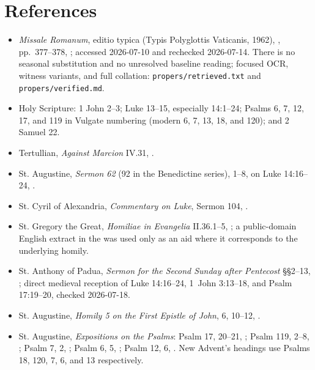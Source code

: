 \section*{References}
{\small
\begin{itemize}
\item \emph{Missale Romanum}, editio typica (Typis Polyglottis Vaticanis, 1962), , pp.~377--378, ; accessed 2026-07-10 and rechecked 2026-07-14. There is no seasonal substitution and no unresolved baseline reading; focused OCR, witness variants, and full collation: \nolinkurl{propers/retrieved.txt} and \nolinkurl{propers/verified.md}.
\item Holy Scripture: 1 John 2--3; Luke 13--15, especially 14:1--24; Psalms 6, 7, 12, 17, and 119 in Vulgate numbering (modern 6, 7, 13, 18, and 120); and 2 Samuel 22.
\item Tertullian, \emph{Against Marcion} IV.31, .
\item St. Augustine, \emph{Sermon 62} (92 in the Benedictine series), 1--8, on Luke 14:16--24, .
\item St. Cyril of Alexandria, \emph{Commentary on Luke}, Sermon 104, .
\item St. Gregory the Great, \emph{Homiliae in Evangelia} II.36.1--5, ; a public-domain English extract in the  was used only as an aid where it corresponds to the underlying homily.
\item St. Anthony of Padua, \emph{Sermon for the Second Sunday after Pentecost} §§2--13, ; direct medieval reception of Luke 14:16--24, 1~John 3:13--18, and Psalm 17:19--20, checked 2026-07-18.
\item St. Augustine, \emph{Homily 5 on the First Epistle of John}, 6, 10--12, .
\item St. Augustine, \emph{Expositions on the Psalms}: Psalm 17, 20--21, ; Psalm 119, 2--8, ; Psalm 7, 2, ; Psalm 6, 5, ; Psalm 12, 6, . New Advent's headings use Psalms 18, 120, 7, 6, and 13 respectively.

\end{itemize}}
